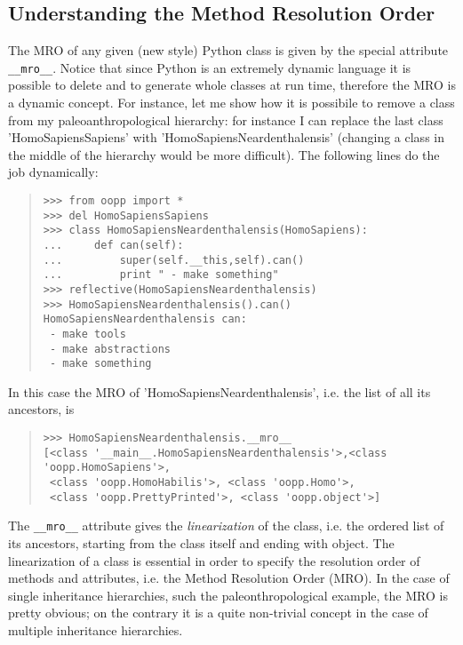 \documentclass[10pt,english]{article}
\begin{document}
\hypertarget{understanding-the-method-resolution-order}{}
\subsection*{Understanding the Method Resolution Order}

The MRO of any given (new style) Python class is given
by the special attribute \texttt{{\_}{\_}mro{\_}{\_}}. Notice that since
Python is an extremely dynamic language it is possible
to delete and to generate whole classes at run time, therefore the MRO
is a dynamic concept. For instance, let me show how it is possibile to 
remove a class from my 
paleoanthropological hierarchy: for instance I can
replace the last class 'HomoSapiensSapiens' with 'HomoSapiensNeardenthalensis'
(changing a class in the middle of the hierarchy would be more difficult). The
following lines do the job dynamically:
\begin{quote}
\begin{verbatim}>>> from oopp import *
>>> del HomoSapiensSapiens
>>> class HomoSapiensNeardenthalensis(HomoSapiens):
...     def can(self):
...         super(self.__this,self).can()
...         print " - make something"
>>> reflective(HomoSapiensNeardenthalensis)
>>> HomoSapiensNeardenthalensis().can()
HomoSapiensNeardenthalensis can:
 - make tools
 - make abstractions
 - make something\end{verbatim}
\end{quote}

In this case the MRO of 'HomoSapiensNeardenthalensis', i.e. the list of
all its ancestors, is
\begin{quote}
\begin{verbatim}>>> HomoSapiensNeardenthalensis.__mro__
[<class '__main__.HomoSapiensNeardenthalensis'>,<class 'oopp.HomoSapiens'>, 
 <class 'oopp.HomoHabilis'>, <class 'oopp.Homo'>, 
 <class 'oopp.PrettyPrinted'>, <class 'oopp.object'>]\end{verbatim}
\end{quote}

The \texttt{{\_}{\_}mro{\_}{\_}} attribute gives the \emph{linearization} of the class, i.e. the
ordered list of its ancestors, starting from the class itself and ending
with object. The linearization of a class is essential in order to specify
the resolution order of methods and attributes, i.e. the Method Resolution
Order (MRO). In the case of single inheritance hierarchies, such the
paleonthropological example, the MRO is pretty obvious; on the contrary
it is a quite non-trivial concept in the case of multiple inheritance 
hierarchies.
\end{document}

